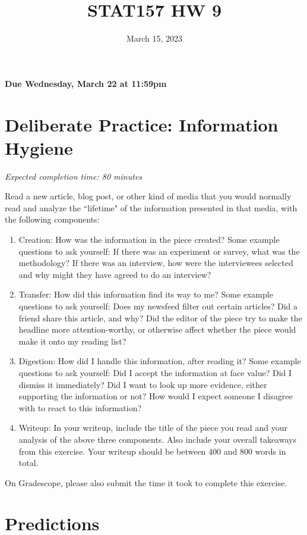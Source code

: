 \documentclass[11pt]{article}
\title{STAT157 HW 9}
\date{March 15, 2023}
\begin{document}
\maketitle

\hfill \textbf{Due Wednesday, March 22 at 11:59pm}




\section*{Deliberate Practice: Information Hygiene}

\emph{Expected completion time: 80 minutes}

Read a new article, blog post, or other kind of media that you would normally read and analyze the ``lifetime" of the information presented in that media, with the following components:
\begin{enumerate}
	\item Creation: How was the information in the piece created? Some example questions to ask yourself: If there was an experiment or survey, what was the methodology? If there was an interview, how were the interviewees selected and why might they have agreed to do an interview? 
	\item Transfer: How did this information find its way to me? Some example questions to ask yourself: Does my newsfeed filter out certain articles? Did a friend share this article, and why? Did the editor of the piece try to make the headline more attention-worthy, or otherwise affect whether the piece would make it onto my reading list?
	\item Digestion: How did I handle this information, after reading it? Some example questions to ask yourself: Did I accept the information at face value? Did I dismiss it immediately? Did I want to look up more evidence, either supporting the information or not? How would I expect someone I disagree with to react to this information?
	\item Writeup: In your writeup, include the title of the piece you read and your analysis of the above three components. Also include your overall takeaways from this exercise. Your writeup should be between 400 and 800 words in total.
\end{enumerate}

On Gradescope, please also submit the time it took to complete this exercise.


\section*{Predictions}
\end{document}
